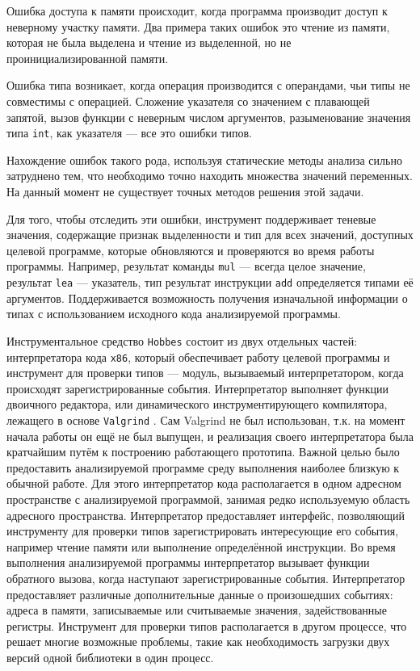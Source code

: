 \documentclass[a4paper,12pt,russian]{article}
\begin{document}
Ошибка доступа к памяти происходит, когда программа производит доступ к неверному участку памяти.
Два примера таких ошибок это чтение из памяти, которая не была выделена и чтение из выделенной, но не проинициализированной памяти.

Ошибка типа возникает, когда операция производится с операндами, чьи типы не совместимы с операцией.
Сложение указателя со значением с плавающей запятой, вызов функции с неверным числом аргументов, разыменование значения типа \texttt{int}, как указателя --- все это ошибки типов.

Нахождение ошибок такого рода, используя статические методы анализа сильно затруднено тем, что необходимо точно находить множества значений переменных.
На данный момент не существует точных методов решения этой задачи.

Для того, чтобы отследить эти ошибки, инструмент поддерживает теневые значения, содержащие признак выделенности и тип для всех значений, доступных целевой программе, которые обновляются и проверяются во время работы программы.
Например, результат команды \texttt{mul} --- всегда целое значение, результат \texttt{lea} --- указатель, тип результат инструкции \texttt{add} определяется типами её аргументов.
Поддерживается возможность получения изначальной информации о типах с использованием исходного кода анализируемой программы.

Инструментальное средство \texttt{Hobbes} состоит из двух отдельных частей: интерпретатора кода \texttt{x86}, который обеспечивает работу целевой программы и инструмент для проверки типов --- модуль, вызываемый интерпретатором, когда происходят зарегистрированные события.
Интерпретатор выполняет функции двоичного редактора, или динамического инструментирующего компилятора, лежащего в основе \texttt{Valgrind} \cite{valgrind}. Сам Valgrind не был использован, т.к. на момент начала работы он ещё не был выпущен, и реализация своего интерпретатора была кратчайшим путём к построению работающего прототипа.
Важной целью было предоставить анализируемой программе среду выполнения наиболее близкую к обычной работе.
Для этого интерпретатор кода располагается в одном адресном пространстве с анализируемой программой, занимая редко используемую область адресного пространства.
Интерпретатор предоставляет интерфейс, позволяющий инструменту для проверки типов зарегистрировать интересующие его события, например чтение памяти или выполнение определённой инструкции.
Во время выполнения анализируемой программы интерпретатор вызывает функции обратного вызова, когда наступают зарегистрированные события.
Интерпретатор предоставляет различные дополнительные данные о произошедших событиях: адреса в памяти, записываемые или считываемые значения, задействованные регистры.
Инструмент для проверки типов располагается в другом процессе, что решает многие возможные проблемы, такие как необходимость загрузки двух версий одной библиотеки в один процесс.
\end{document}
